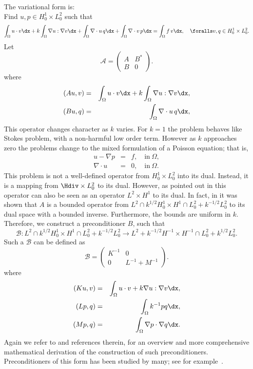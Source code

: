 The variational form is: \\
Find $u,p \in H^1_0 \times L_0^2$ such that
\[
\int_\Omega u \cdot v \dx +
k \int_\Omega \nabla u : \nabla v \dx +
\int_\Omega \nabla \cdot u \, q \dx +
\int_\Omega \nabla \cdot v \, p \dx = \int_\Omega f\, v \dx, \quad
\foralls v,q \in H^1_0 \times L_0^2.
\]
Let
\[
\mathcal{A}  =
\begin{pmatrix} A & B^* \\ B & 0 \end{pmatrix}.
\]
where
\begin{eqnarray}
(A u, v) &=& \int_\Omega u \cdot v \dx +  k \int_\Omega \nabla u :
\nabla v \dx, \\
(B u, q) &=& \int_\Omega \nabla \cdot u \, q \dx,
\end{eqnarray}
This operator changes character as $k$ varies.  For $k=1$ the problem
behaves like Stokes problem, with a non-harmful low order
term. However as $k$ approaches zero the problems change to the mixed
formulation of a Poisson equation; that is,
\begin{eqnarray}
u - \nabla p &=& f, \quad \mbox{in} \ \Omega, \\
\nabla \cdot u  &=& 0, \quad \mbox{in} \ \Omega.
\end{eqnarray}
This problem is not a well-defined operator from $H^1_0 \times L_0^2$
into its dual. Instead, it is a mapping from $\Hdiv \times L_0^2$ to
its dual.  However, as pointed out in \citet{MardalWinther2004} this
operator can also be seen as an operator $L^2 \times H^1$ to its dual.
In fact, in \citet{MardalTaiWinther2002,MardalWinther2004} it was
shown that $A$ is a bounded operator from $L^2 \cap k^{1/2}
H^1_0 \times H^1 \cap L_0^2 + k^{-1/2} L_0^2$ to its dual space with a
bounded inverse. Furthermore, the bounds are uniform in $k$.
Therefore, we construct a preconditioner $B$, such that
\[
\mathcal{B}: L^2 \cap k^{1/2} H^1_0 \times H^1 \cap L_0^2 + k^{-1/2} L_0^2 \rightarrow
L^2 + k^{-1/2} H^{-1} \times H^{-1} \cap L_0^2 + k^{1/2} L_0^2  .
\]
Such a $\mathcal{B}$ can be defined as
\[
\mathcal{B}
=
\begin{pmatrix} K^{-1} & 0 \\ 0 & L^{-1} + M^{-1} \end{pmatrix}.
\]
where
\begin{eqnarray}
(K u, v) &=& \int_\Omega u\cdot v  +  k \nabla u: \nabla v \dx, \\
(L p, q) &=& \int_\Omega k^{-1} p q \dx, \\
(M p, q) &=& \int_\Omega \nabla p \cdot  \nabla q \dx.
\end{eqnarray}
Again we refer to \citet{MardalWinther11} and references therein, for
an overview and more comprehensive mathematical derivation of the
construction of such preconditioners.  Preconditioners of this form
has been studied by many; see for
example~\citet{CahouetChabard1988,ElmanSilvesterWathen2005,MardalWinther2004,MardalWinther11,Turek1999}.

